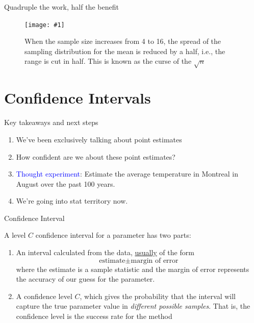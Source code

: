 \documentclass[handout]{beamer}\usepackage[]{graphicx}\usepackage[]{color}
\newcommand {\framedgraphiccaption}[2] {
	\begin{figure}
		\centering
		\texttt{[image: \#1]}
		\caption{#2}
	\end{figure}
}
\newcommand {\framedgraphic}[1] {
	\begin{figure}
		\centering
		\texttt{[image: \#1]}
	\end{figure}
}
\begin{document}
\begin{frame}[fragile]{Quadruple the work, half the benefit}

\framedgraphiccaption{ROOToceanAll.png}{When the sample size increases from 4 to 16, the spread of the sampling distribution for the mean is reduced by a half, i.e., the range is cut in half. This is known as the curse of the $\sqrt{n}$}
\end{frame}


\section{Confidence Intervals}


\begin{frame}{Key takeaways and next steps}
\begin{enumerate}
	\setlength\itemsep{2em}
	\item We've been exclusively talking about point estimates \pause
	\item How confident are we about these point estimates? \pause
	\item \textcolor{blue}{Thought experiment}: Estimate the average temperature in Montreal in August over the past 100 years. \pause  
	\item We're going into stat territory now. 
\end{enumerate}
\end{frame}


\begin{frame}{Confidence Interval}

\begin{defm}
A level $C$ confidence interval for a parameter has two parts:
\begin{enumerate}
	\item An interval calculated from the data, \underline{usually} of the form $$\textrm{estimate} \pm \textrm{margin of error}$$ where the estimate is a sample statistic and the margin of error represents the accuracy of our guess for the parameter.
 \item A confidence level $C$, which gives the probability that the interval will capture the true parameter value in \textit{different possible samples}. That is, the confidence level is the success rate for the method
\end{enumerate}
\end{defm}


\end{frame}
\end{document}
